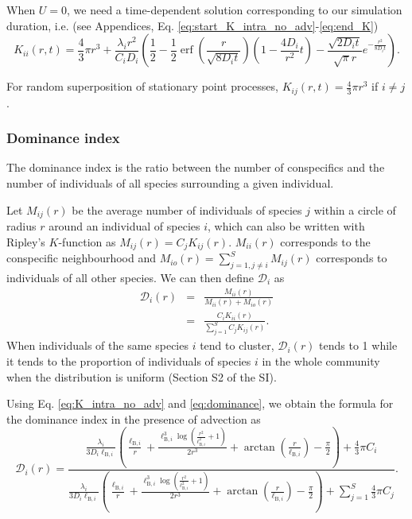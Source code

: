 \documentclass[12pt,english]{article}
\DeclareMathOperator\erf{erf}
\newcommand{\ellB}{\ell_{\mathrm{B},i}}
\begin{document}
When $U=0$, we need a time-dependent solution corresponding to our
simulation duration, i.e. (see Appendices, Eq. \ref{eq:start_K_intra_no_adv}-\ref{eq:end_K})
\begin{equation}
K_{ii}(r,t)=\frac{4}{3}\pi r^{3}+\frac{\lambda_{i}r^{2}}{C_{i}D_{i}}\left(\frac{1}{2}-\frac{1}{2}\erf\left(\frac{r}{\sqrt{8D_{i}t}}\right)\left(1-\frac{4D_{i}}{r^{2}}t\right)-\frac{\sqrt{2D_{i}t}}{\sqrt{\pi}r}e^{-\frac{r^{2}}{8D_{i}t}}\right).\label{eq:K_intra_no_adv}
\end{equation}

For random superposition of stationary point processes, $K_{ij}(r,t)=\frac{4}{3}\pi r^{3}$
if $i\neq j$ \citep[p. 324, eq. 5.3.5]{illian2008statistical}.

\subsubsection*{Dominance index}

The dominance index \citep[defined in Table S1 in the Supporting Information of][]{wiegand_how_2007}
is the ratio between the number of conspecifics and the number of
individuals of all species surrounding a given individual.

Let $M_{ij}(r)$ be the average number of individuals of species $j$
within a circle of radius $r$ around an individual of species $i$,
which can also be written with Ripley's $K$-function as $M_{ij}(r)=C_{j}K_{ij}(r)$.
$M_{ii}(r)$ corresponds to the conspecific neighbourhood and $M_{io}(r)=\sum_{j=1,j\neq i}^{S}M_{ij}(r)$
corresponds to individuals of all other species. We can then define
$\mathcal{D}_{i}$ as 
\begin{equation}
\begin{array}{ccc}
\mathcal{D}_{i}(r) & = & \frac{M_{ii}(r)}{M_{ii}(r)+M_{io}(r)}\\
 & = & \frac{C_{i}K_{ii}(r)}{\sum_{j=1}^{S}C_{j}K_{ij}(r)}.
\end{array}\label{eq:dominance}
\end{equation}
 When individuals of the same species $i$ tend to cluster, $\mathcal{D}_{i}(r)$
tends to 1 while it tends to the proportion of individuals of species
$i$ in the whole community when the distribution is uniform (Section
S2 of the SI).

Using Eq. \ref{eq:K_intra_no_adv} and \ref{eq:dominance}, we obtain
the formula for the dominance index in the presence of advection as
\begin{equation}
\mathcal{D}_{i}(r)=\frac{\frac{\lambda_{i}}{3D_{i}\ellB}\left(\frac{\ellB}{r}+\frac{\ellB^{3}\log\left(\frac{r^{2}}{\ellB^{2}}+1\right)}{2r^{3}}+\arctan\left(\frac{r}{\ellB}\right)-\frac{\pi}{2}\right)+\frac{4}{3}\pi C_{i}}{\frac{\lambda_{i}}{3D_{i}\ellB}\left(\frac{\ellB}{r}+\frac{\ellB^{3}\log\left(\frac{r^{2}}{\ellB^{2}}+1\right)}{2r^{3}}+\arctan\left(\frac{r}{\ellB}\right)-\frac{\pi}{2}\right)+\sum_{j=1}^{S}\frac{4}{3}\pi C_{j}}.\label{eq:dom_adv}
\end{equation}
\end{document}
